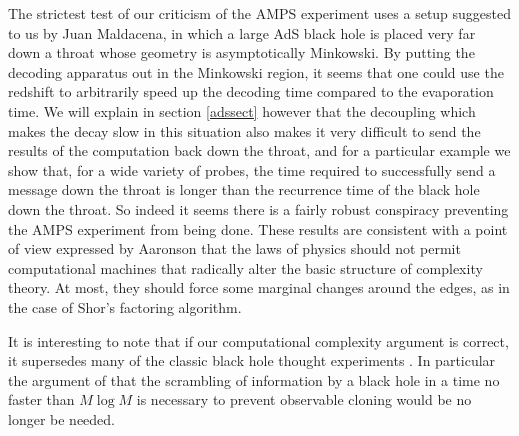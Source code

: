 \documentclass[12pt]{article}
\begin{document}
The strictest test of our criticism of the AMPS experiment uses a setup suggested to us by Juan Maldacena, in which a large AdS black hole is placed very far down a throat whose geometry is asymptotically Minkowski. By putting the decoding apparatus out in the Minkowski region, it seems that one could use the redshift to arbitrarily speed up the decoding time compared to the evaporation time.  We will explain in section \ref{adssect} however that the decoupling which makes the decay slow in this situation also makes it very difficult to send the results of the computation back down the throat, and for a particular example we show that, for a wide variety of probes, the time required to successfully send a message down the throat is longer than the recurrence time of the black hole down the throat.  So indeed it seems there is a fairly robust conspiracy preventing the AMPS experiment from being done.  These results are consistent with a point of view expressed by Aaronson \cite{Aaronson:2005qu} that the laws of physics should not permit computational machines that radically alter the basic structure of complexity theory. At most, they should force some marginal changes around the edges, as in the case of Shor's factoring algorithm.

It is interesting to note that if our computational complexity argument is correct, it supersedes many of the classic black hole thought experiments \cite{sussthorug,sussthor,susspol,HaydenPreskill}.  In particular the argument of \cite{HaydenPreskill} that the scrambling of information by a black hole in a time no faster than $M\log M$ is necessary to prevent observable cloning would be no longer be needed.    
\end{document}
